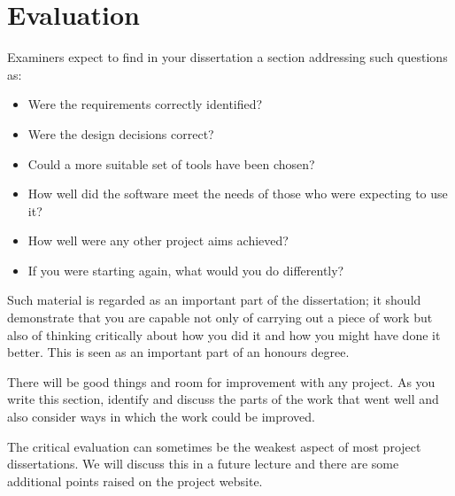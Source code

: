 \chapter{Evaluation}

Examiners expect to find in your dissertation a section addressing such questions as:

\begin{itemize}
   \item Were the requirements correctly identified? 
   \item Were the design decisions correct?
   \item Could a more suitable set of tools have been chosen?
   \item How well did the software meet the needs of those who were expecting to use it?
   \item How well were any other project aims achieved?
   \item If you were starting again, what would you do differently?
\end{itemize}

Such material is regarded as an important part of the dissertation; it should demonstrate that you are capable not only of carrying out a piece of work but also of thinking critically about how you did it and how you might have done it better. This is seen as an important part of an honours degree. 

There will be good things and room for improvement with any project. As you write this section, identify and discuss the parts of the work that went well and also consider ways in which the work could be improved. 

The critical evaluation can sometimes be the weakest aspect of most project dissertations. We will discuss this in a future lecture and there are some additional points raised on the project website. 
